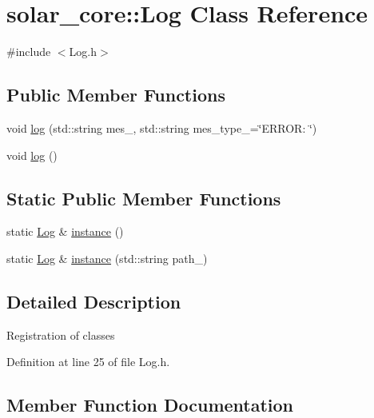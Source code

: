 \hypertarget{classsolar__core_1_1_log}{}\section{solar\+\_\+core\+:\+:Log Class Reference}
\label{classsolar__core_1_1_log}


{\ttfamily \#include $<$Log.\+h$>$}

\subsection*{Public Member Functions}
\begin{DoxyCompactItemize}
\item 
void \hyperlink{classsolar__core_1_1_log_a2162de95feb02b60387ea86c8fb3fad6}{log} (std\+::string mes\+\_\+, std\+::string mes\+\_\+type\+\_\+=\char`\"{}E\+R\+R\+O\+R\+: \char`\"{})
\end{DoxyCompactItemize}
{\bf }\par
\begin{DoxyCompactItemize}
\item 
void \hyperlink{classsolar__core_1_1_log_a9976b4394d20e3157b3c0b2e6436ce89}{log} ()
\end{DoxyCompactItemize}

\subsection*{Static Public Member Functions}
\begin{DoxyCompactItemize}
\item 
static \hyperlink{classsolar__core_1_1_log}{Log} \& \hyperlink{classsolar__core_1_1_log_a4540f1a5e950c5c6e85aa6ffe4cf4604}{instance} ()
\item 
static \hyperlink{classsolar__core_1_1_log}{Log} \& \hyperlink{classsolar__core_1_1_log_a8fc72525a3a13d00dfd3442aabe8e0cc}{instance} (std\+::string path\+\_\+)
\end{DoxyCompactItemize}


\subsection{Detailed Description}
Registration of classes 

Definition at line 25 of file Log.\+h.



\subsection{Member Function Documentation}
\hypertarget{classsolar__core_1_1_log_a4540f1a5e950c5c6e85aa6ffe4cf4604}{}
